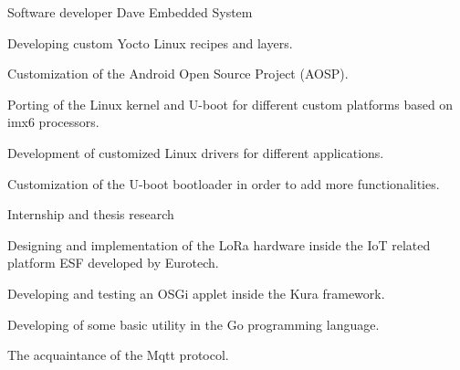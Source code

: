 \documentclass[english,a4paper]{europasscv}
\begin{document}
\begin{europasscv}


		 {
			Software developer Dave Embedded System
		}
		\ecvitem{} {
			\begin{ecvitemize}
				\item Developing custom Yocto Linux recipes and layers.
				\item Customization of the Android Open Source Project (AOSP).
				\item Porting of the Linux kernel and U-boot for different custom
					platforms based on imx6 processors.
				\item Development of customized Linux drivers for different
					applications.
				\item Customization of the U-boot bootloader in order to add
					more functionalities.
			\end{ecvitemize}
		}

		 {
			Internship and thesis research
		}
		\ecvitem{} {
			\begin{ecvitemize}
					\item Designing and implementation of the LoRa hardware
						inside the IoT related platform ESF developed by Eurotech.
					\item Developing and testing an OSGi applet inside the Kura
						framework.
					\item Developing of some basic utility in the Go programming
						language.
					\item The acquaintance of the Mqtt protocol.
			\end{ecvitemize}
		}


\end{europasscv}
\end{document}
